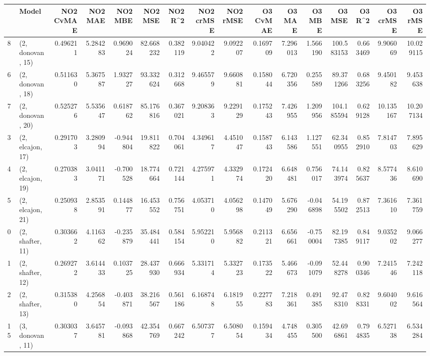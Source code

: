 \begin{tabular}{llrrrrrrrrrrrrrr}
\toprule
{} &             Model &  NO2 CvMAE &   NO2 MAE &   NO2 MBE &    NO2 MSE &   NO2 R\textasciicircum2 &  NO2 crMSE &  NO2 rMSE &  O3 CvMAE &     O3 MAE &    O3 MBE &      O3 MSE &    O3 R\textasciicircum2 &   O3 crMSE &    O3 rMSE \\
\midrule
8  &  (2, donovan, 15) &   0.496211 &  5.284283 &  0.969024 &  82.668232 &  0.382119 &   9.040422 &  9.092207 &  0.169709 &   7.296013 &  1.566190 &  100.583153 &  0.663469 &   9.906069 &  10.029115 \\
6  &  (2, donovan, 18) &   0.511630 &  5.367587 &  1.932727 &  93.332624 &  0.312668 &   9.465579 &  9.660881 &  0.158044 &   6.720356 &  0.255589 &   89.371266 &  0.683256 &   9.450182 &   9.453638 \\
7  &  (2, donovan, 20) &   0.525276 &  5.535647 &  0.618762 &  85.176816 &  0.367021 &   9.208363 &  9.229129 &  0.175243 &   7.426955 &  1.209956 &  104.185594 &  0.629128 &  10.135167 &  10.207134 \\
3  &  (2, elcajon, 17) &   0.291703 &  3.280994 & -0.944804 &  19.811822 &  0.704061 &   4.349617 &  4.451047 &  0.158743 &   6.143586 &  1.127551 &   62.340955 &  0.852910 &   7.814703 &   7.895629 \\
4  &  (2, elcajon, 19) &   0.270383 &  3.041171 & -0.700528 &  18.774664 &  0.721144 &   4.275971 &  4.332974 &  0.172420 &   6.648481 &  0.756017 &   74.143974 &  0.825637 &   8.577436 &   8.610690 \\
5  &  (2, elcajon, 21) &   0.250938 &  2.853591 &  0.144877 &  16.453552 &  0.756751 &   4.053710 &  4.056298 &  0.147049 &   5.676290 & -0.046898 &   54.195502 &  0.872513 &   7.361610 &   7.361759 \\
0  &  (2, shafter, 11) &   0.303662 &  4.116362 & -0.235879 &  35.484441 &  0.584154 &   5.952210 &  5.956882 &  0.211321 &   6.656661 & -0.750004 &   82.197385 &  0.849117 &   9.035202 &   9.066277 \\
1  &  (2, shafter, 12) &   0.269272 &  3.614433 &  0.103725 &  28.437930 &  0.666934 &   5.331714 &  5.332723 &  0.173522 &   5.466673 & -0.091079 &   52.448278 &  0.900346 &   7.241546 &   7.242118 \\
2  &  (2, shafter, 13) &   0.315380 &  4.256854 & -0.403871 &  38.216567 &  0.561186 &   6.168748 &  6.181955 &  0.227783 &   7.218361 &  0.491385 &   92.478310 &  0.828331 &   9.604002 &   9.616564 \\
15 &  (3, donovan, 11) &   0.303037 &  3.645781 & -0.093868 &  42.354769 &  0.667242 &   6.507377 &  6.508054 &  0.159434 &   4.748455 &  0.305500 &   42.696861 &  0.794835 &   6.527138 &   6.534284 \\

\end{tabular}
